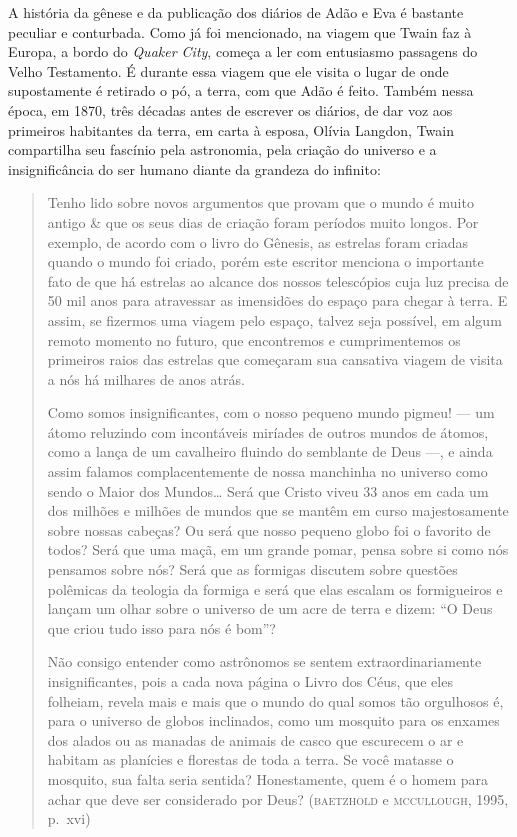 A história da gênese e da publicação dos diários de Adão e Eva é bastante
peculiar e conturbada. Como já foi mencionado, na viagem que
Twain faz à Europa, a bordo do \textit{Quaker City}, começa a ler com entusiasmo
passagens do Velho Testamento. É durante essa viagem que ele visita o lugar de
onde supostamente é retirado o pó, a terra, com que Adão é feito. Também
nessa época, em 1870, três décadas antes de escrever os diários, de dar voz
aos primeiros habitantes da terra, em carta à esposa, Olívia Langdon,
Twain compartilha seu fascínio pela astronomia, pela criação do universo e
a insignificância do ser humano diante da grandeza do infinito:

\begin{quote}
Tenho lido sobre novos argumentos que provam que o mundo é muito antigo \&
que os seus dias de criação foram períodos muito longos. Por exemplo, de
acordo com o livro do Gênesis, as estrelas foram criadas quando o mundo
foi criado, porém este escritor menciona o importante fato de que há
estrelas ao alcance dos nossos telescópios cuja luz precisa de 50 mil anos
para atravessar as imensidões do espaço para chegar à terra. E assim, se
fizermos uma viagem pelo espaço, talvez seja possível, em algum remoto
momento no futuro, que encontremos e cumprimentemos os primeiros raios das
estrelas que começaram sua cansativa viagem de visita a nós há milhares de
anos atrás.

Como somos insignificantes, com o nosso pequeno mundo pigmeu! --- um átomo
reluzindo com incontáveis miríades de outros mundos de átomos, como a lança
de um cavalheiro fluindo do semblante de Deus ---, e ainda assim falamos
complacentemente de nossa manchinha no universo como sendo o Maior dos
Mundos\ldots{} Será que Cristo viveu 33 anos em cada um dos milhões e milhões
de mundos que se mantêm em curso majestosamente sobre nossas cabeças? Ou
será que nosso pequeno globo foi o favorito de todos? Será que uma maçã,
em um grande pomar, pensa sobre si como nós pensamos sobre nós? Será que
as formigas discutem sobre questões polêmicas da teologia da formiga e
será que elas escalam os formigueiros e lançam um olhar sobre o universo
de um acre de terra e dizem: “O Deus que criou tudo isso para nós é bom”?

Não consigo entender como astrônomos se sentem extraordinariamente
insignificantes, pois a cada nova página o Livro dos Céus, que eles
folheiam, revela mais e mais que o mundo do qual somos tão
orgulhosos é, para o universo de globos inclinados, como um mosquito
para os enxames dos alados ou as manadas de animais de casco que
escurecem o ar e habitam as planícies e florestas de toda a terra. Se você
matasse o mosquito, sua falta seria sentida? Honestamente, quem é o
homem para achar que deve ser considerado por Deus? (\textsc{baetzhold} e
\textsc{mccullough}, 1995, p.~xvi)
\end{quote}

